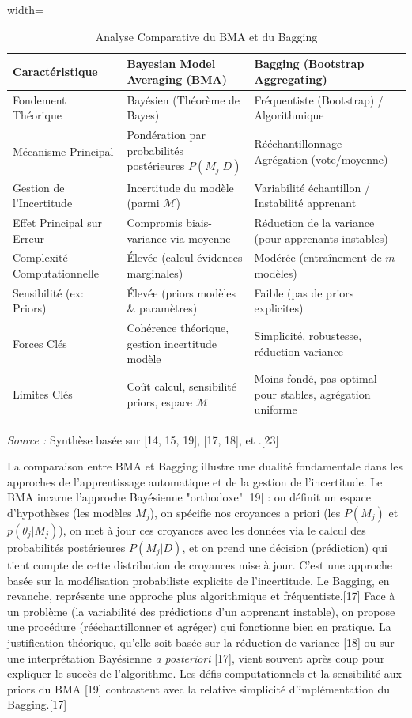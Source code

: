 \documentclass[11pt,a4paper]{article}
\begin{document}
\begin{table}[ht]
\centering
\caption{Analyse Comparative du BMA et du Bagging}
\label{tab:bma_vs_bagging}
\begin{adjustbox}{width=\textwidth}
\begin{tabular}{@{}lll@{}}
\toprule
Caractéristique & Bayesian Model Averaging (BMA) & Bagging (Bootstrap Aggregating) \\ \midrule
Fondement Théorique & Bayésien (Théorème de Bayes) & Fréquentiste (Bootstrap) / Algorithmique \\
Mécanisme Principal & Pondération par probabilités postérieures $P(M_j|D)$ & Rééchantillonnage + Agrégation (vote/moyenne) \\
Gestion de l'Incertitude & Incertitude du modèle (parmi $\mathcal{M}$) & Variabilité échantillon / Instabilité apprenant \\
Effet Principal sur Erreur & Compromis biais-variance via moyenne & Réduction de la variance (pour apprenants instables) \\
Complexité Computationnelle & Élevée (calcul évidences marginales) & Modérée (entraînement de $m$ modèles) \\
Sensibilité (ex: Priors) & Élevée (priors modèles \& paramètres) & Faible (pas de priors explicites) \\
Forces Clés & Cohérence théorique, gestion incertitude modèle & Simplicité, robustesse, réduction variance \\
Limites Clés & Coût calcul, sensibilité priors, espace $\mathcal{M}$ & Moins fondé, pas optimal pour stables, agrégation uniforme \\ \bottomrule
\end{tabular}
\end{adjustbox}
\footnotesize{\textit{Source :} Synthèse basée sur \citet{Wasserman2000} [14, 15, 19], \citet{Domingos1997} [17, 18], et \citet{Domingos2012}.[23]}
\end{table}

La comparaison entre BMA et Bagging illustre une dualité fondamentale dans les approches de l'apprentissage automatique et de la gestion de l'incertitude. Le BMA incarne l'approche Bayésienne "orthodoxe" [19] : on définit un espace d'hypothèses (les modèles $M_j$), on spécifie nos croyances a priori (les $P(M_j)$ et $p(\theta_j|M_j)$), on met à jour ces croyances avec les données via le calcul des probabilités postérieures $P(M_j|D)$, et on prend une décision (prédiction) qui tient compte de cette distribution de croyances mise à jour. C'est une approche basée sur la modélisation probabiliste explicite de l'incertitude. Le Bagging, en revanche, représente une approche plus algorithmique et fréquentiste.[17] Face à un problème (la variabilité des prédictions d'un apprenant instable), on propose une procédure (rééchantillonner et agréger) qui fonctionne bien en pratique. La justification théorique, qu'elle soit basée sur la réduction de variance [18] ou sur une interprétation Bayésienne \textit{a posteriori} [17], vient souvent après coup pour expliquer le succès de l'algorithme. Les défis computationnels et la sensibilité aux priors du BMA [19] contrastent avec la relative simplicité d'implémentation du Bagging.[17]
\end{document}
